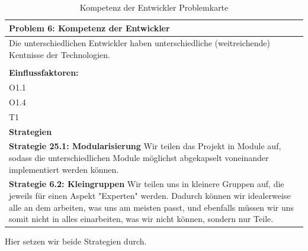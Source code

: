 \documentclass[fontsize=12pt,paper=a4,twoside]{scrartcl}
\begin{document}
\begin{table}[H]
    \centering
    \begin{tabular}{|p{15cm}|}
    \hline
          \textbf{Problem 6: Kompetenz der Entwickler}  \\ \hline
	Die unterschiedlichen Entwickler haben unterschiedliche (weitreichende) Kentnisse der Technologien. \\
         \\ \hline
          \textbf{Einflussfaktoren: } \\
	O1.1 \\
	O1.4 \\
	T1 \\
          \hline
          \textbf{Strategien} \\ \hline
            {}          
           \label{strategie:6.1}     
          \textbf{Strategie 25.1: Modularisierung} Wir teilen das Projekt in Module auf, sodass die unterschiedlichen Module möglichst abgekapselt voneinander implementiert werden können. \\        
  {}          
           \label{strategie:6.2}              
          \textbf{Strategie 6.2: Kleingruppen} Wir teilen uns in kleinere Gruppen auf, die jeweils für einen Aspekt "Experten" werden. Dadurch können wir idealerweise alle an dem arbeiten, was uns am meisten passt, und ebenfalls müssen wir uns somit nicht in alles einarbeiten, was wir nicht können, sondern nur Teile. \\
    \end{tabular}

    \caption{Kompetenz der Entwickler Problemkarte}
    \label{tab:ProblemKarte6}
\end{table}
Hier setzen wir beide Strategien durch. \\
\end{document}

